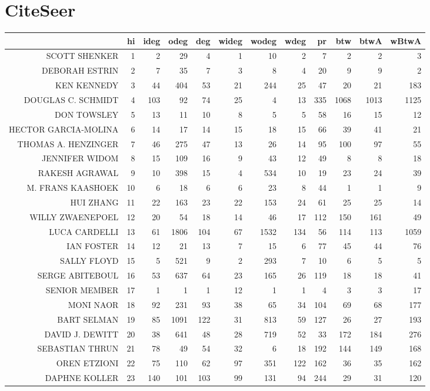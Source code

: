 \documentclass{bakalarka}
\begin{document}
\section{CiteSeer}
\begin{table}[!ht]
\centering
\begin{sideways}
\begin{scriptsize}
\begin{tabular}{r|r|rrrrrrrrrr}
\toprule
&hi&ideg&odeg&deg&wideg&wodeg&wdeg&pr&btw&btwA&wBtwA\\
\midrule
SCOTT SHENKER&1&2&29&4&1&10&2&7&2&2&3\\
DEBORAH ESTRIN&2&7&35&7&3&8&4&20&9&9&2\\
KEN KENNEDY&3&44&404&53&21&244&25&47&20&21&183\\
DOUGLAS C. SCHMIDT&4&103&92&74&25&4&13&335&1068&1013&1125\\
DON TOWSLEY&5&13&11&10&8&5&5&58&16&15&12\\
HECTOR GARCIA-MOLINA&6&14&17&14&15&18&15&66&39&41&21\\
THOMAS A. HENZINGER&7&46&275&47&13&26&14&95&100&97&55\\
JENNIFER WIDOM&8&15&109&16&9&43&12&49&8&8&18\\
RAKESH AGRAWAL&9&10&398&15&4&534&10&19&23&24&39\\
M. FRANS KAASHOEK&10&6&18&6&6&23&8&44&1&1&9\\
HUI ZHANG&11&22&163&23&22&153&24&61&25&25&14\\
WILLY ZWAENEPOEL&12&20&54&18&14&46&17&112&150&161&49\\
LUCA CARDELLI&13&61&1806&104&67&1532&134&56&114&113&1059\\
IAN FOSTER&14&12&21&13&7&15&6&77&45&44&76\\
SALLY FLOYD&15&5&521&9&2&293&7&10&6&5&5\\
SERGE ABITEBOUL&16&53&637&64&23&165&26&119&18&18&41\\
SENIOR MEMBER&17&1&1&1&12&1&1&4&3&3&17\\
MONI NAOR&18&92&231&93&38&65&34&104&69&68&177\\
BART SELMAN&19&85&1091&122&31&813&59&127&26&27&193\\
DAVID J. DEWITT&20&38&641&48&28&719&52&33&172&184&276\\
SEBASTIAN THRUN&21&78&49&54&32&6&18&192&144&149&168\\
OREN ETZIONI&22&75&110&62&97&351&122&162&36&35&162\\
DAPHNE KOLLER&23&140&101&103&99&131&94&244&29&31&120\\

\end{tabular}
\end{scriptsize}
\end{sideways}
\end{table}
\end{document}
